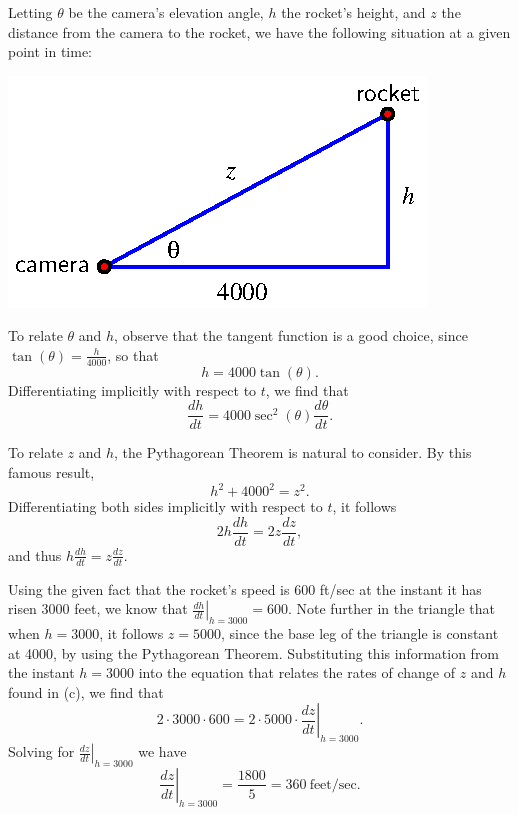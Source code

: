 \begin{activitySolution}
\ba
	\item Letting $\theta$ be the camera's elevation angle, $h$ the rocket's height, and $z$ the distance from the camera to the rocket, we have the following situation at a given point in time:
	\begin{center}
	\includegraphics{figures/3_5_Act2Soln.eps}
	\end{center}
	\item To relate $\theta$ and $h$, observe that the tangent function is a good choice, since $\tan(\theta) = \frac{h}{4000}$, so that
	$$h = 4000 \tan(\theta).$$
	Differentiating implicitly with respect to $t$, we find that
	$$\frac{dh}{dt} = 4000 \sec^2 (\theta) \frac{d\theta}{dt}.$$
	\item To relate $z$ and $h$, the Pythagorean Theorem is natural to consider.  By this famous result, 
	$$h^2 + 4000^2 = z^2.$$
	Differentiating both sides implicitly with respect to $t$, it follows
	$$2h \frac{dh}{dt} = 2z \frac{dz}{dt},$$
	and thus $h \frac{dh}{dt} = z \frac{dz}{dt}.$
	\item Using the given fact that the rocket's speed is 600 ft/sec at the instant it has risen 3000 feet, we know that $\left. \frac{dh}{dt} \right|_{h=3000} = 600$.  Note further in the triangle that when $h = 3000$, it follows $z = 5000$, since the base leg of the triangle is constant at 4000, by using the Pythagorean Theorem.  Substituting this information from the instant $h = 3000$ into the equation that relates the rates of change of $z$ and $h$ found in (c), we find that 
	$$2 \cdot 3000 \cdot 600 = 2 \cdot 5000 \cdot \left. \frac{dz}{dt} \right|_{h=3000}.$$
	Solving for $\left. \frac{dz}{dt} \right|_{h=3000}$ we have 
	$$\left. \frac{dz}{dt} \right|_{h=3000} = \frac{1800}{5} = 360 \ \mbox{feet/sec}.$$
	

\end{activitySolution}
